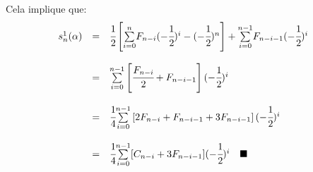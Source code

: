 Cela implique que:
\[
	\begin{array}{l l l}
		s_{n}^{1}(\alpha) & =       & \cfrac{1}{2}\left[\underset{i=0}{\overset{n}{\sum}}F_{n-i}(-\cfrac{1}{2})^{i}-(-\cfrac{1}{2})^{n}\right]+\underset{i=0}{\overset{n-1}{\sum}}F_{n-i-1}(-\cfrac{1}{2})^{i} \\
		                  & \text{} &                                                                                                                                                                          \\
		                  & =       & \underset{i=0}{\overset{n-1}{\sum}}\left[\cfrac{F_{n-i}}{2}+F_{n-i-1}\right](-\cfrac{1}{2})^{i}                                                                          \\
		                  & \text{} &                                                                                                                                                                          \\
		                  & =       & \cfrac{1}{4}\underset{i=0}{\overset{n-1}{\sum}}\left[2F_{n-i}+F_{n-i-1}+3F_{n-i-1}\right](-\cfrac{1}{2})^{i}                                                             \\
		                  & \text{} &                                                                                                                                                                          \\
		                  & =       & \cfrac{1}{4}\underset{i=0}{\overset{n-1}{\sum}}[C_{n-i}+3F_{n-i-1}](-\cfrac{1}{2})^{i}
		\hspace{10pt}\blacksquare\end{array}
\]

